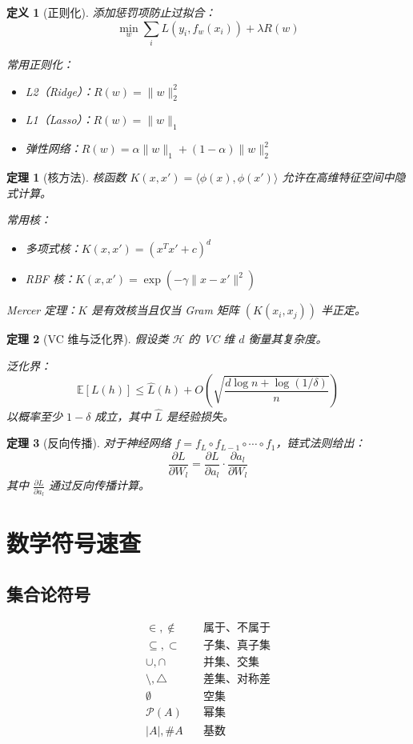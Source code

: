\documentclass[12pt]{article}
\newtheorem{theorem}{定理}[section]
\newtheorem{definition}{定义}[section]
\begin{document}
\begin{definition}[正则化]
添加惩罚项防止过拟合：
$$\min_w \sum_i L(y_i, f_w(x_i)) + \lambda R(w)$$

常用正则化：
\begin{itemize}
\item L2（Ridge）：$R(w) = \|w\|_2^2$
\item L1（Lasso）：$R(w) = \|w\|_1$
\item 弹性网络：$R(w) = \alpha\|w\|_1 + (1-\alpha)\|w\|_2^2$
\end{itemize}
\end{definition}

\begin{theorem}[核方法]
核函数 $K(x, x') = \langle \phi(x), \phi(x') \rangle$ 允许在高维特征空间中隐式计算。

常用核：
\begin{itemize}
\item 多项式核：$K(x, x') = (x^T x' + c)^d$
\item RBF 核：$K(x, x') = \exp(-\gamma\|x - x'\|^2)$
\end{itemize}

Mercer 定理：$K$ 是有效核当且仅当 Gram 矩阵 $(K(x_i, x_j))$ 半正定。
\end{theorem}

\begin{theorem}[VC 维与泛化界]
假设类 $\mathcal{H}$ 的 VC 维 $d$ 衡量其复杂度。

泛化界：
$$\mathbb{E}[L(h)] \leq \hat{L}(h) + O\left(\sqrt{\frac{d \log n + \log(1/\delta)}{n}}\right)$$
以概率至少 $1 - \delta$ 成立，其中 $\hat{L}$ 是经验损失。
\end{theorem}

\begin{theorem}[反向传播]
对于神经网络 $f = f_L \circ f_{L-1} \circ \cdots \circ f_1$，链式法则给出：
$$\frac{\partial L}{\partial W_l} = \frac{\partial L}{\partial a_l} \cdot \frac{\partial a_l}{\partial W_l}$$
其中 $\frac{\partial L}{\partial a_l}$ 通过反向传播计算。
\end{theorem}

\section{数学符号速查}

\subsection{集合论符号}
\begin{align*}
\in, \notin &\quad \text{属于、不属于} \\
\subseteq, \subset &\quad \text{子集、真子集} \\
\cup, \cap &\quad \text{并集、交集} \\
\setminus, \triangle &\quad \text{差集、对称差} \\
\emptyset &\quad \text{空集} \\
\mathcal{P}(A) &\quad \text{幂集} \\
|A|, \#A &\quad \text{基数}
\end{align*}
\end{document}
